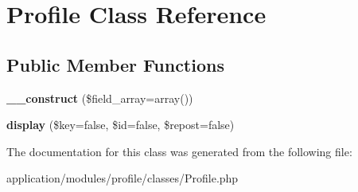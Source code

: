 \hypertarget{class_profile}{
\section{Profile Class Reference}
\label{class_profile}
}
\subsection*{Public Member Functions}
\begin{DoxyCompactItemize}
\item 
\hypertarget{class_profile_acf87ec1c608ae218b6b9b8a879edffe2}{
{\bfseries \_\-\_\-construct} (\$field\_\-array=array())}
\label{class_profile_acf87ec1c608ae218b6b9b8a879edffe2}

\item 
\hypertarget{class_profile_a0e46c6f02ff157e8499de491bc04e5d2}{
{\bfseries display} (\$key=false, \$id=false, \$repost=false)}
\label{class_profile_a0e46c6f02ff157e8499de491bc04e5d2}

\end{DoxyCompactItemize}


The documentation for this class was generated from the following file:\begin{DoxyCompactItemize}
\item 
application/modules/profile/classes/Profile.php\end{DoxyCompactItemize}
